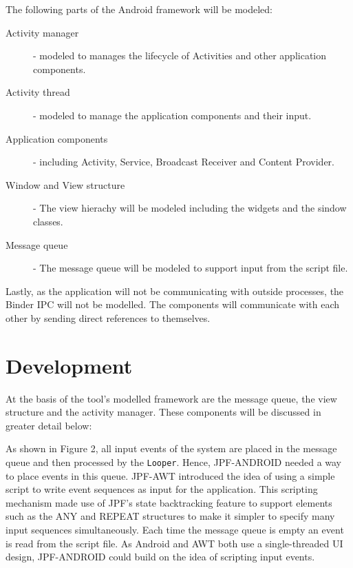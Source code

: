 \documentclass{acm_proc_article-sp}
\begin{document}
The following parts of the Android framework will be modeled:
\begin{description}
 \item [Activity manager] - modeled to manages the lifecycle of Activities and other application components.
 \item [Activity thread] - modeled to manage the application components and their input.
 \item [Application components] - including Activity, Service, Broadcast Receiver and Content Provider. 
 \item [Window and View structure] - The view hierachy will be modeled including the widgets and the sindow classes.
 \item [Message queue] - The message queue will be modeled to support input from the script file.
\end{description}

Lastly, as the application will not be communicating with outside processes, the Binder IPC will not be modelled.
The components will communicate with each other by sending direct references to themselves. 

\section{Development}
At the basis of the tool's modelled framework are the message queue, the view structure and the activity manager. These components will be
discussed in greater detail below:

As shown in Figure 2, all input events of the system are placed in the message queue and then processed by the \texttt{Looper}. Hence,
JPF-ANDROID needed a way to place events in this queue. JPF-AWT introduced the idea of using a simple script to write event sequences as
input for the application. This scripting mechanism made use of JPF's state backtracking feature to support elements such as the ANY and
REPEAT structures to make it simpler to specify many input sequences simultaneously. Each time the message queue is empty an event is
read from the script file. As Android and AWT both use a single-threaded UI design, JPF-ANDROID could build on the idea of scripting input events. 

\end{document}
